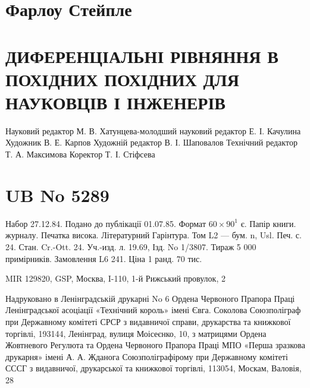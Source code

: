 \documentclass[
]{article}
\begin{document}
\section{Фарлоу
Стейпле}\label{ux444ux430ux440ux43bux43eux443-ux441ux442ux435ux439ux43fux43bux435}

\section{ДИФЕРЕНЦІАЛЬНІ РІВНЯННЯ В ПОХІДНИХ ПОХІДНИХ ДЛЯ НАУКОВЦІВ І
ІНЖЕНЕРІВ}\label{ux434ux438ux444ux435ux440ux435ux43dux446ux456ux430ux43bux44cux43dux456-ux440ux456ux432ux43dux44fux43dux43dux44f-ux432-ux43fux43eux445ux456ux434ux43dux438ux445-ux43fux43eux445ux456ux434ux43dux438ux445-ux434ux43bux44f-ux43dux430ux443ux43aux43eux432ux446ux456ux432-ux456-ux456ux43dux436ux435ux43dux435ux440ux456ux432}

Науковий редактор М. В. Хатунцева-молодший науковий редактор Е. І.
Качулина Художник В. Е. Карпов Художній редактор В. І. Шаповалов
Технічний редактор Т. А. Максимова Коректор Т. І. Стіфсева

\section{UB No 5289}\label{ub-no-5289}

Набор 27.12.84. Подано до публікації 01.07.85. Формат \(60\times90^{1}\)
є. Папір книги. журналу. Печатка висока. Літературний Гарінтура. Том L2
--- бум. n, Usl. Печ. с. 24. Стан. Cr.-Ott. 24. Уч.-изд. л. 19.69, Ізд.
No 1/3807. Тираж 5 000 примірників. Замовлення L6 241. Ціна 1 ранд. 70
тис.

MIR 129820, GSP, Москва, I-110, 1-й Рижський провулок, 2

Надруковано в Ленінградській друкарні No 6 Ордена Червоного Прапора
Праці Ленінградської асоціації «Технічний король» імені Євга. Соколова
Союзполіграф при Державному комітеті СРСР з видавничої справи,
друкарства та книжкової торгівлі, 193144, Ленінград, вулиця Моісеєнко,
10, з матрицями Ордена Жовтневого Регулюта та Ордена Червоного Прапора
Праці МПО «Перша зразкова друкарня» імені А. А. Жданога
Союзполіграфірому при Державному комітеті СССГ з видавничої, друкарської
та книжкової торгівлі, 113054, Москам, Валовія, 28
\end{document}
